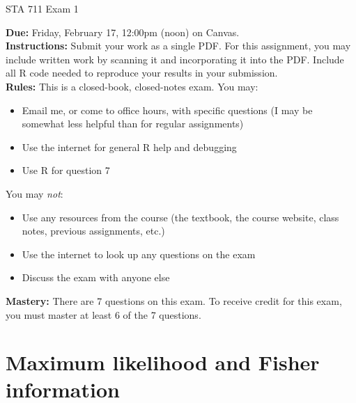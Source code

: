 \documentclass[11pt]{article}
\begin{document}
\begin{center}
\Large
STA 711 Exam 1\\
\normalsize
\vspace{5mm}
\end{center}

\noindent \textbf{Due:} Friday, February 17, 12:00pm (noon) on Canvas.\\ 

\noindent \textbf{Instructions:} Submit your work as a single PDF. For this assignment, you may include written work by scanning it and incorporating it into the PDF. Include all R code needed to reproduce your results in your submission.\\

\noindent \textbf{Rules:} This is a closed-book, closed-notes exam. You may:
\begin{itemize}
\item Email me, or come to office hours, with specific questions (I may be somewhat less helpful than for regular assignments)
\item Use the internet for general R help and debugging
\item Use R for question 7
\end{itemize}
You may \textit{not}:
\begin{itemize}
\item Use any resources from the course (the textbook, the course website, class notes, previous assignments, etc.)
\item Use the internet to look up any questions on the exam
\item Discuss the exam with anyone else
\end{itemize}

\noindent \textbf{Mastery:} There are 7 questions on this exam. To receive credit for this exam, you must master at least 6 of the 7 questions.

\newpage

\section*{Maximum likelihood and Fisher information}
\end{document}
